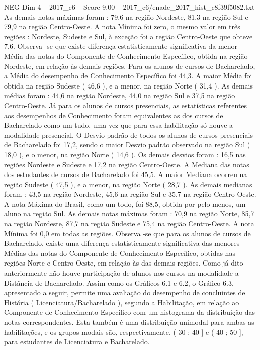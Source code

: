 \begin{textsample}{NEG Dim 4 – 2017\_c6 – Score 9.00 – 2017\_c6/enade\_2017\_hist\_c8f39f5082.txt}
As demais notas máximas foram : 79,6 na região Nordeste, 81,3 na região Sul e 79,9 na região Centro-Oeste.
A nota Mínima foi zero, o mesmo valor em três regiões : Nordeste, Sudeste e Sul, à exceção foi a região Centro-Oeste que obteve 7,6.
Observa -se que existe diferença estatisticamente significativa da menor Média das notas do Componente de Conhecimento Específico, obtida na região Nordeste, em relação às demais regiões.
Para os alunos de cursos de Bacharelado, a Média do desempenho de Conhecimento Específico foi 44,3.
A maior Média foi obtida na região Sudeste ( 46,6 ), e a menor, na região Norte ( 31,4 ).
As demais médias foram : 44,6 na região Nordeste, 44,0 na região Sul e 37,5 na região Centro-Oeste.
Já para os alunos de cursos presenciais, as estatísticas referentes aos desempenhos de Conhecimento foram equivalentes as dos cursos de Bacharelado como um tudo, uma vez que para essa habilitação só houve a modalidade presencial.
O Desvio padrão de todos os alunos de cursos presenciais de Bacharelado foi 17,2, sendo o maior Desvio padrão observado na região Sul ( 18,0 ), e o menor, na região Norte ( 14,6 ).
Os demais desvios foram : 16,5 nas regiões Nordeste e Sudeste e 17,2 na região Centro-Oeste.
A Mediana das notas dos estudantes de cursos de Bacharelado foi 45,5.
A maior Mediana ocorreu na região Sudeste ( 47,5 ), e a menor, na região Norte ( 28,7 ).
As demais medianas foram : 43,5 na região Nordeste, 45,6 na região Sul e 35,7 na região Centro-Oeste.
A nota Máxima do Brasil, como um todo, foi 88,5, obtida por pelo menos, um aluno na região Sul.
As demais notas máximas foram : 70,9 na região Norte, 85,7 na região Nordeste, 87,7 na região Sudeste e 75,4 na região Centro-Oeste.
A nota Mínima foi 0,0 em todas as regiões.
Observa -se que para os alunos de cursos de Bacharelado, existe uma diferença estatisticamente significativa das menores Médias das notas do Componente de Conhecimento Específico, obtidas nas regiões Norte e Centro-Oeste, em relação às das demais regiões.
Como já dito anteriormente não houve participação de alunos nos cursos na modalidade a Distância de Bacharelado.
Assim como os Gráficos 6.1 e 6.2, o Gráfico 6.3, apresentado a seguir, permite uma avaliação do desempenho de concluintes de História ( Licenciatura/Bacharelado ), segundo a Habilitação, em relação ao Componente de Conhecimento Específico com um histograma da distribuição das notas correspondentes.
Esta também é uma distribuição unimodal para ambas as habilitações, e os grupos modais são, respectivamente, ( 30 ; 40 ] e ( 40 ; 50 ], para estudantes de Licenciatura e Bacharelado.

\end{textsample}
